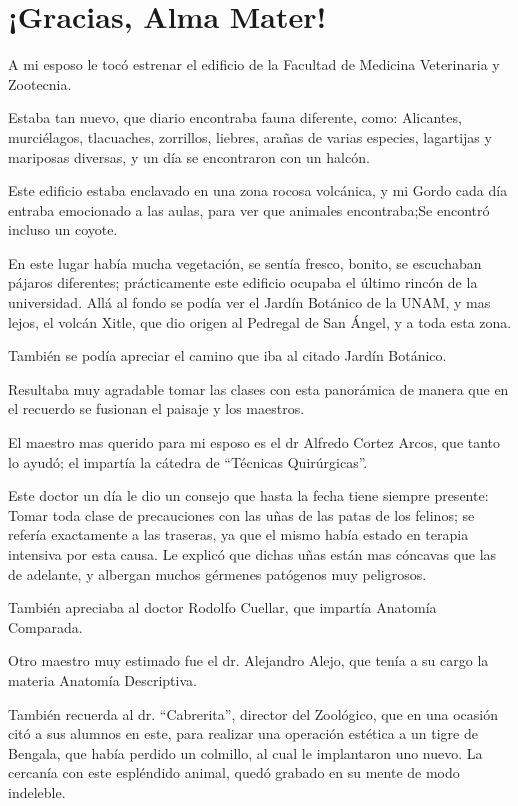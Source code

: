 \documentclass[letterpaper, 12pt]{book}
\begin{document}
\chapter{¡Gracias, Alma Mater!}
A mi esposo le tocó estrenar el edificio de la Facultad de Medicina Veterinaria y Zootecnia. 

Estaba tan nuevo, que diario encontraba fauna diferente, como: Alicantes, murciélagos, tlacuaches, zorrillos, liebres, arañas de varias especies, lagartijas y mariposas diversas, y un día se encontraron con un halcón.

Este edificio estaba enclavado en una zona rocosa volcánica, y mi Gordo cada día entraba emocionado a las aulas, para ver que animales encontraba;Se encontró incluso un coyote.

En este lugar había mucha vegetación, se sentía fresco, bonito, se escuchaban pájaros diferentes; prácticamente este edificio ocupaba el último rincón de la universidad.
Allá al fondo se podía ver el Jardín Botánico de la UNAM, y mas lejos, el volcán Xitle, que dio origen al Pedregal de San Ángel, y a toda esta zona.

También se podía apreciar el camino que iba al citado Jardín Botánico.

Resultaba muy agradable tomar las clases con esta panorámica de manera que en el recuerdo se fusionan el paisaje y los maestros.

El maestro mas querido para mi esposo es el dr Alfredo Cortez Arcos, que tanto lo ayudó; el impartía la cátedra de ``Técnicas Quirúrgicas''.

Este doctor un día le dio un  consejo que hasta la fecha tiene siempre presente: Tomar toda clase de precauciones con las uñas de las patas de los felinos; se refería exactamente a las traseras, ya que el mismo había estado en terapia intensiva por esta causa. Le explicó que dichas uñas están mas cóncavas que las de adelante, y albergan muchos gérmenes patógenos muy peligrosos.

También apreciaba al doctor Rodolfo Cuellar, que impartía Anatomía Comparada.

Otro maestro muy estimado fue el dr. Alejandro Alejo, que tenía a su cargo la materia Anatomía Descriptiva.

También recuerda al dr. ``Cabrerita'', director del Zoológico, que en una ocasión citó a sus alumnos en este, para realizar una operación estética a un tigre de Bengala, que había perdido un colmillo, al cual le implantaron uno nuevo. La cercanía con este espléndido animal, quedó grabado en su mente de modo
indeleble.
\end{document}
